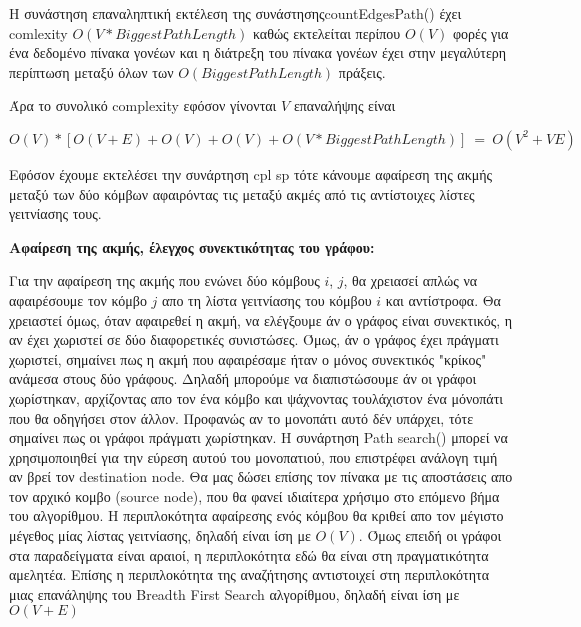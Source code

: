 \documentclass{article}
\begin{document}
Η συνάστηση επαναληπτική εκτέλεση της συνάστησηςcountEdgesPath() έχει comlexity
$O(V*Biggest Path Length)$ καθώς εκτελείται περίπου $Ο(V)$ φορές για ένα δεδομένο πίνακα γονέων και η διάτρεξη του πίνακα γονέων έχει στην μεγαλύτερη περίπτωση μεταξύ όλων των $Ο(Biggest Path Length)$ πράξεις.\bigbreak

Άρα το συνολικό complexity εφόσον γίνονται $V$ επαναλήψης είναι 

$Ο(V) * [O(V+E)+O(V)+O(V)+Ο(V*Biggest Path Length)] \ = \ O(V^2 + VE)$\bigbreak

Eφόσον έχουμε εκτελέσει την συνάρτηση cpl sp τότε κάνουμε αφαίρεση της ακμής μεταξύ των δύο κόμβων αφαιρόντας τις μεταξύ ακμές από τις αντίστοιχες λίστες γειτνίασης τους.\pagebreak

\textbf{Αφαίρεση της ακμής, έλεγχος συνεκτικότητας του γράφου:}\bigbreak

Για την αφαίρεση της ακμής που ενώνει δύο κόμβους $i$, $j$, θα χρειασεί απλώς να αφαιρέσουμε τον κόμβο $j$ απο τη λίστα γειτνίασης του κόμβου $i$ και αντίστροφα.
Θα χρειαστεί όμως, όταν αφαιρεθεί η ακμή, να ελέγξουμε άν ο γράφος είναι συνεκτικός, η αν έχει χωριστεί σε δύο διαφορετικές συνιστώσες. 
Όμως, άν ο γράφος έχει πράγματι χωριστεί, σημαίνει πως η ακμή που αφαιρέσαμε ήταν ο μόνος συνεκτικός "κρίκος" ανάμεσα στους δύο γράφους.
Δηλαδή μπορούμε να διαπιστώσουμε άν οι γράφοι χωρίστηκαν, αρχίζοντας απο τον ένα κόμβο και ψάχνοντας τουλάχιστον ένα μόνοπάτι που θα οδηγήσει στον άλλον.
Προφανώς αν το μονοπάτι αυτό δέν υπάρχει, τότε σημαίνει πως οι γράφοι πράγματι χωρίστηκαν.
Η συνάρτηση Path search() μπορεί να χρησιμοποιηθεί για την εύρεση αυτού του μονοπατιού, που επιστρέφει ανάλογη τιμή αν
βρεί τον destination node. Θα μας δώσει επίσης τον πίνακα με τις αποστάσεις απο τον αρχικό κομβο 
(source node), που θα φανεί ιδιαίτερα χρήσιμο στο επόμενο βήμα του αλγορίθμου.\bigbreak
Η περιπλοκότητα αφαίρεσης ενός κόμβου θα κριθεί απο τον μέγιστο μέγεθος μίας λίστας γειτνίασης, δηλαδή είναι ίση με $Ο(V)$. Όμως επειδή οι γράφοι στα παραδείγματα 
είναι αραιοί, η περιπλοκότητα εδώ θα είναι στη πραγματικότητα αμελητέα.
Επίσης η περιπλοκότητα της αναζήτησης αντιστοιχεί στη περιπλοκότητα μιας επανάληψης του  Breadth First Search
αλγορίθμου, δηλαδή είναι ίση με $Ο(V + Ε)$ \bigbreak
\end{document}
